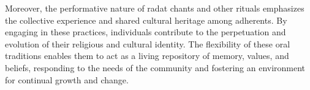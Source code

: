 Moreover, the performative nature of radat chants and other rituals emphasizes the collective experience and shared cultural heritage among adherents. By engaging in these practices, individuals contribute to the perpetuation and evolution of their religious and cultural identity. The flexibility of these oral traditions enables them to act as a living repository of memory, values, and beliefs, responding to the needs of the community and fostering an environment for continual growth and change.


